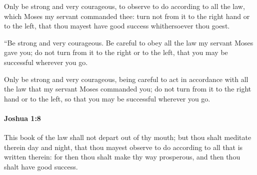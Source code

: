 			\begin{versebox}
					\item[BHS] 
					\item[ASV] Only be strong and very courageous, to observe to do according to all the law, which Moses my servant commanded thee: turn not from it to the right hand or to the left, that thou mayest have good success whithersoever thou goest.
					\item[NIV] “Be strong and very courageous. Be careful to obey all the law my servant Moses gave you; do not turn from it to the right or to the left, that you may be successful wherever you go.
					\item[NRSV] Only be strong and very courageous, being careful to act in accordance with all the law that my servant Moses commanded you; do not turn from it to the right hand or to the left, so that you may be successful wherever you go.
			\end{versebox}

		\paragraph{Joshua 1:8} %
			\label{JOSHUA-1-8}

			This book of the law shall not depart out of thy mouth; but thou shalt meditate therein day and night, that thou mayest observe to do according to all that is written therein: for then thou shalt make thy way prosperous, and then thou shalt have good success.

